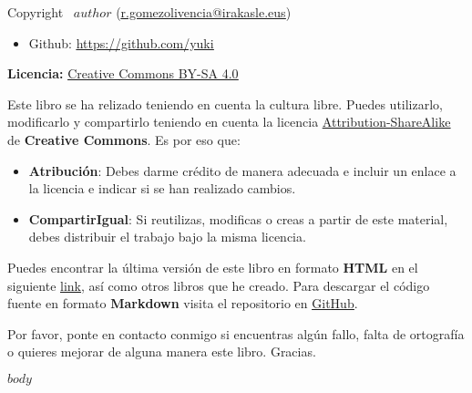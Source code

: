 \documentclass[11pt,titlepage,twoside,openany]{book}
\makeatletter
\let\oldhref\href
\renewcommand{\href}[2]{\oldhref{#1}{\underline{#2}}}
\renewcommand\tableofcontents{
  \begingroup
    \hypersetup{hidelinks} %
    \pagestyle{toc}
    \setcounter{tocdepth}{2}    %
    \setcounter{secnumdepth}{4} %
    \setlength{\parskip}{0em}
    \@starttoc{toc}
    \setlength{\parskip}{1.2em}
  \endgroup
  \thispagestyle{toc} %
  \clearpage
}
\newenvironment{custombox}[4]{
  \begin{tcolorbox}[
      colframe=#1, colbacktitle=#1,
      colupper=#1, colback=#2,
      enhanced, sidebyside, segmentation hidden,
      lefthand width=1.2cm,
      title=\textbf{#3},]
    \centering
    \color{#1}
    \fontsize{30pt}{-10pt}#4
    \tcblower
    \color{#1}
}{
  \end{tcolorbox}
}
\def\infoname{Informazioa}
\def\infoname{Información}
\newenvironment{infobox}{
  \begin{custombox}{cyan!60!black}{cyan!5!white}{\infoname}{\faInfoCircle}
}{
  \end{custombox}
}
\makeatother
\begin{document}
\restoregeometry
\clearpage %

\thispagestyle{empty}

\null
\vfill
\begin{flushleft}
    

    Copyright \textcopyright \ $author$ \hspace{1pt} (\href{mailto:r.gomezolivencia@irakasle.eus}{r.gomezolivencia@irakasle.eus})
    \begin{itemize}
        \item Github: \href{https://github.com/yuki}{https://github.com/yuki}
    \end{itemize}


    \vspace{5mm}
    \textbf{Licencia: } \href{https://creativecommons.org/licenses/by-sa/4.0/deed.es}{Creative Commons BY-SA 4.0}


    Este libro se ha relizado teniendo en cuenta la cultura libre. Puedes utilizarlo, modificarlo y compartirlo teniendo en cuenta la licencia \href{https://creativecommons.org/licenses/by-sa/4.0/}{Attribution-ShareAlike} de \textbf{Creative Commons}. Es por eso que:

    \begin{itemize}
        \item \textbf{Atribución}: Debes darme crédito de manera adecuada e incluir un enlace a la licencia e indicar si se han realizado cambios.
        \item \textbf{CompartirIgual}: Si reutilizas, modificas o creas a partir de este material, debes distribuir el trabajo bajo la misma licencia.
    \end{itemize}


    Puedes encontrar la última versión de este libro en formato \textbf{HTML} en el siguiente \href{https://yuki.github.io/my-books/}{link}, así como otros libros que he creado. Para descargar el código fuente en formato \textbf{Markdown} visita el repositorio en \href{https://github.com/yuki/my-books}{GitHub}.

    \begin{infobox}
        Por favor, ponte en contacto conmigo si encuentras algún fallo, falta de ortografía o quieres mejorar de alguna manera este libro. Gracias.
    \end{infobox}
    \vspace{5mm}
\end{flushleft}

\clearpage %


\makeatletter
  \renewcommand\@dotsep{200}
\makeatother

\tableofcontents


$body$
\end{document}
